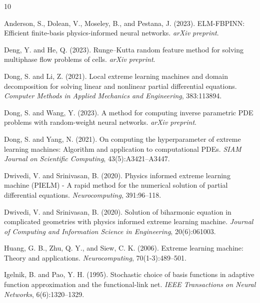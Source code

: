 \documentclass[11pt]{article}
\begin{document}

\begin{thebibliography}{10}

Anderson, S., Dolean, V., Moseley, B., and Pestana, J. (2023).
\newblock ELM-FBPINN: Efficient finite-basis physics-informed neural networks.
\newblock \emph{arXiv preprint}.

Deng, Y. and He, Q. (2023).
\newblock Runge--Kutta random feature method for solving multiphase flow problems of cells.
\newblock \emph{arXiv preprint}.

Dong, S. and Li, Z. (2021).
\newblock Local extreme learning machines and domain decomposition for solving linear and nonlinear partial differential equations.
\newblock \emph{Computer Methods in Applied Mechanics and Engineering}, 383:113894.

Dong, S. and Wang, Y. (2023).
\newblock A method for computing inverse parametric PDE problems with random-weight neural networks.
\newblock \emph{arXiv preprint}.

Dong, S. and Yang, N. (2021).
\newblock On computing the hyperparameter of extreme learning machines: Algorithm and application to computational PDEs.
\newblock \emph{SIAM Journal on Scientific Computing}, 43(5):A3421--A3447.

Dwivedi, V. and Srinivasan, B. (2020).
\newblock Physics informed extreme learning machine (PIELM) - A rapid method for the numerical solution of partial differential equations.
\newblock \emph{Neurocomputing}, 391:96--118.

Dwivedi, V. and Srinivasan, B. (2020).
\newblock Solution of biharmonic equation in complicated geometries with physics informed extreme learning machine.
\newblock \emph{Journal of Computing and Information Science in Engineering}, 20(6):061003.

Huang, G. B., Zhu, Q. Y., and Siew, C. K. (2006).
\newblock Extreme learning machine: Theory and applications.
\newblock \emph{Neurocomputing}, 70(1-3):489--501.

Igelnik, B. and Pao, Y. H. (1995).
\newblock Stochastic choice of basis functions in adaptive function approximation and the functional-link net.
\newblock \emph{IEEE Transactions on Neural Networks}, 6(6):1320--1329.


\end{thebibliography}
\end{document}
